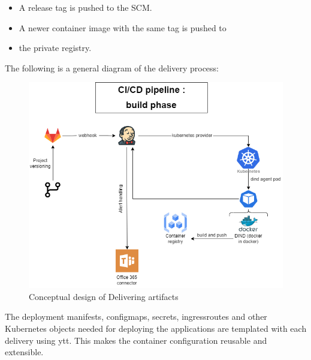 \begin{itemize}[label={--}]
\item A release tag is pushed to the SCM. 
\item A newer container image with the same tag is pushed to \item the private registry. 
\end{itemize}

The following is a general diagram of the delivery process: 

\begin{figure}[H]\centering
\includegraphics[width=1.0\textwidth,angle=00]{assets/f49.png}
\caption{Conceptual design of Delivering artifacts }
\label{fig:Conceptual design of Delivering artifacts }
\end{figure}

The deployment manifests, configmaps, secrets, ingressroutes and other Kubernetes objects needed for deploying the applications are templated with each delivery using ytt. This makes the container configuration reusable and extensible.